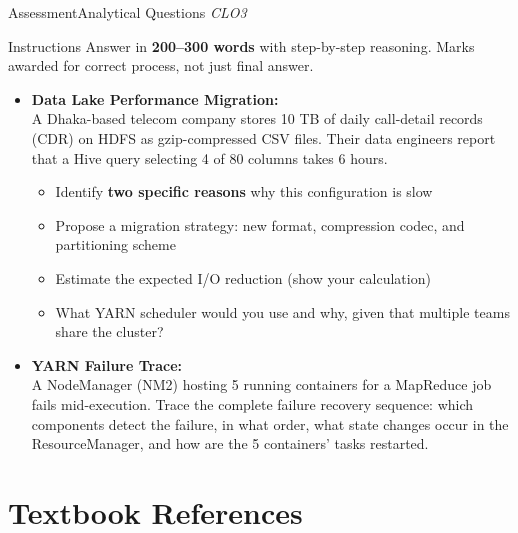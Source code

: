 \documentclass[aspectratio=169,10pt]{beamer}
\begin{document}
\begin{frame}{Assessment\textemdash Analytical Questions \hfill\small\textit{CLO3}}
  \begin{block}{Instructions}
    Answer in \textbf{200--300 words} with step-by-step reasoning.  Marks awarded for correct process, not just final answer.
  \end{block}
  \vspace{6pt}
  \begin{itemize}
    \item[\textbf{A1.}] \textbf{Data Lake Performance Migration:}\\
    A Dhaka-based telecom company stores 10 TB of daily call-detail records (CDR) on HDFS as gzip-compressed CSV files.  Their data engineers report that a Hive query selecting 4 of 80 columns takes 6 hours.
    \begin{itemize}
      \item Identify \textbf{two specific reasons} why this configuration is slow
      \item Propose a migration strategy: new format, compression codec, and partitioning scheme
      \item Estimate the expected I/O reduction (show your calculation)
      \item What YARN scheduler would you use and why, given that multiple teams share the cluster?
    \end{itemize}
  \end{itemize}
  \vspace{6pt}
  \begin{itemize}
    \item[\textbf{A2.}] \textbf{YARN Failure Trace:}\\
    A NodeManager (NM2) hosting 5 running containers for a MapReduce job fails mid-execution.  Trace the complete failure recovery sequence: which components detect the failure, in what order, what state changes occur in the ResourceManager, and how are the 5 containers' tasks restarted.
  \end{itemize}
\end{frame}

\section*{Textbook References}
\end{document}
